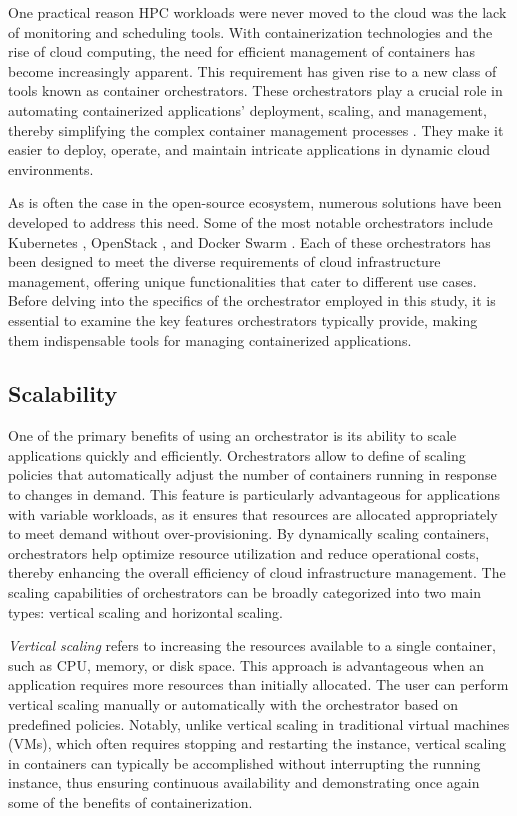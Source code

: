 One practical reason HPC workloads were never moved to the cloud was the lack of
monitoring and scheduling  tools. With containerization technologies and the
rise of cloud computing, the need for efficient management of containers has
become increasingly apparent. This requirement has given rise to a new class of
tools known as container orchestrators. These orchestrators play a crucial role
in automating containerized applications' deployment, scaling, and management,
thereby simplifying the complex container management processes
\cite{Rodriguez2018}. They make it easier to deploy, operate, and maintain
intricate applications in dynamic cloud environments.

As is often the case in the open-source ecosystem, numerous solutions have been
developed to address this need.
Some of the most notable orchestrators include Kubernetes
\cite{bookofkubernetes}, OpenStack \cite{Lima2017}, and Docker Swarm
\cite{Singh2023}.
Each of these orchestrators has been designed to meet the diverse requirements
of cloud infrastructure management, offering unique functionalities that cater
to different use cases.
Before delving into the specifics of the orchestrator employed in this study, it
is essential to examine the key features orchestrators typically provide, making
them indispensable tools for managing containerized applications.

\subsection{Scalability}

One of the primary benefits of using an orchestrator is its ability to scale
applications quickly and efficiently.
Orchestrators allow to define of scaling policies that automatically adjust the
number of containers running in response to changes in demand.
This feature is particularly advantageous for applications with variable
workloads, as it ensures that resources are allocated appropriately to meet
demand without over-provisioning.
By dynamically scaling containers, orchestrators help optimize resource
utilization and reduce operational costs, thereby enhancing the overall
efficiency of cloud infrastructure management.
The scaling capabilities of orchestrators can be broadly categorized into two
main types: vertical scaling and horizontal scaling.

\textit{Vertical scaling} refers to increasing the resources available to a single
container, such as CPU, memory, or disk space.
This approach is advantageous when an application requires more resources than
initially allocated.
The user can perform vertical scaling manually or automatically with the
orchestrator based on predefined policies.
Notably, unlike vertical scaling in traditional virtual machines (VMs), which
often requires stopping and restarting the instance, vertical scaling in
containers can typically be accomplished without interrupting the running
instance, thus ensuring continuous availability and demonstrating once again
some of the benefits of containerization.

